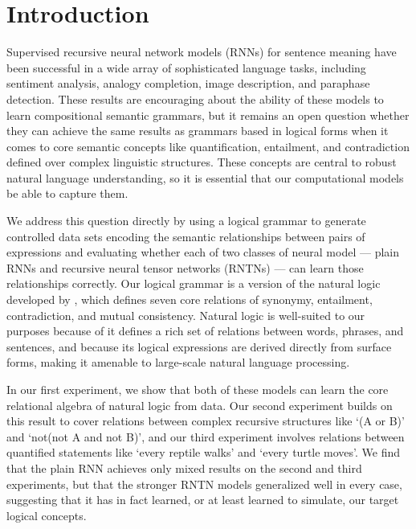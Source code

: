 \section{Introduction}\label{sec:intro}


Supervised recursive neural network models (RNNs) for sentence meaning
have been successful in a wide array of sophisticated language tasks,
including sentiment analysis, analogy completion, image description,
and paraphase detection. These results are encouraging about the
ability of these models to learn compositional semantic grammars, but
it remains an open question whether they can achieve the same results
as grammars based in logical forms when it comes to core semantic
concepts like quantification, entailment, and contradiction defined
over complex linguistic structures. These concepts are central to
robust natural language understanding, so it is essential that our
computational models be able to capture them.

We address this question directly by using a logical grammar to
generate controlled data sets encoding the semantic relationships
between pairs of expressions and evaluating whether each of two
classes of neural model --- plain RNNs and recursive neural tensor
networks (RNTNs) --- can learn those relationships correctly. Our
logical grammar is a version of the natural logic developed by
\cite{maccartney2009extended}, which defines seven core relations of
synonymy, entailment, contradiction, and mutual consistency. Natural
logic is well-suited to our purposes because of it defines a rich set
of relations between words, phrases, and sentences, and because its
logical expressions are derived directly from surface forms, making it
amenable to large-scale natural language processing.

In our first experiment, we show that both of these models can learn
the core relational algebra of natural logic from data. Our second
experiment builds on this result to cover relations between complex
recursive structures like `(A or B)' and `not(not A and not B)', and
our third experiment involves relations between quantified statements
like `every reptile walks' and `every turtle moves'. We find that the
plain RNN achieves only mixed results on the second and third
experiments, but that the stronger RNTN models generalized well in
every case, suggesting that it has in fact learned, or at least
learned to simulate, our target logical concepts. %

